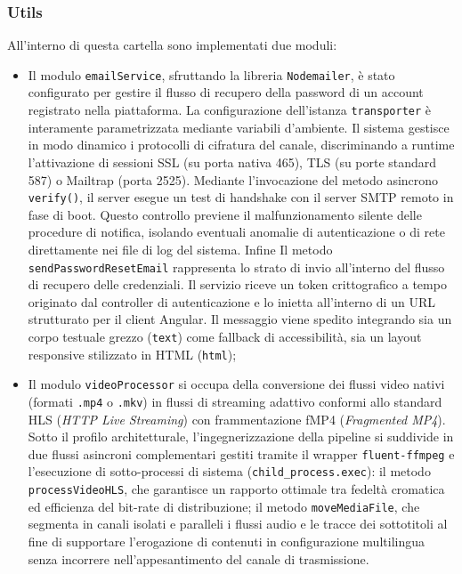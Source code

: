 \documentclass[11pt,a4paper]{article}
\begin{document}
\subsubsection{Utils}
All’interno di questa cartella sono implementati due moduli: 
\begin{itemize}
    \item Il modulo \texttt{emailService}, sfruttando la libreria \texttt{Nodemailer}, è stato configurato per gestire il flusso di recupero della password di un account registrato nella piattaforma. La configurazione dell'istanza \texttt{transporter} è interamente parametrizzata mediante variabili d'ambiente. Il sistema gestisce in modo dinamico i protocolli di cifratura del canale, discriminando a runtime l'attivazione di sessioni SSL (su porta nativa 465), TLS (su porte standard 587) o Mailtrap (porta 2525). Mediante l'invocazione del metodo asincrono \texttt{verify()}, il server esegue un test di handshake con il server SMTP remoto in fase di boot. Questo controllo previene il malfunzionamento silente delle procedure di notifica, isolando eventuali anomalie di autenticazione o di rete direttamente nei file di log del sistema. Infine Il metodo \texttt{sendPasswordResetEmail} rappresenta lo strato di invio all'interno del flusso di recupero delle credenziali. Il servizio riceve un token crittografico a tempo originato dal controller di autenticazione e lo inietta all'interno di un URL strutturato per il client Angular. Il messaggio viene spedito integrando sia un corpo testuale grezzo (\texttt{text}) come fallback di accessibilità, sia un layout responsive stilizzato in HTML (\texttt{html});
    \item Il modulo \texttt{videoProcessor} si occupa della conversione dei flussi video nativi (formati \texttt{.mp4} o \texttt{.mkv}) in flussi di streaming adattivo conformi allo standard HLS (\textit{HTTP Live Streaming}) con frammentazione fMP4 (\textit{Fragmented MP4}). Sotto il profilo architetturale, l'ingegnerizzazione della pipeline si suddivide in due flussi asincroni complementari gestiti tramite il wrapper \texttt{fluent-ffmpeg} e l'esecuzione di sotto-processi di sistema (\texttt{child\_process.exec}): il metodo \texttt{processVideoHLS}, che garantisce un rapporto ottimale tra fedeltà cromatica ed efficienza del bit-rate di distribuzione; il metodo \texttt{moveMediaFile}, che segmenta in canali isolati e paralleli i flussi audio e le tracce dei sottotitoli al fine di supportare l'erogazione di contenuti in configurazione multilingua senza incorrere nell'appesantimento del canale di trasmissione.
\end{itemize}
\end{document}
